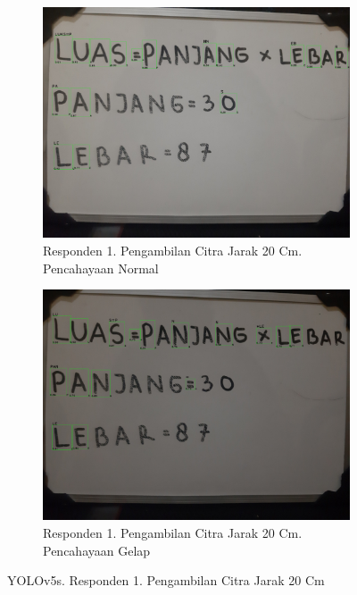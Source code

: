 \begin{figure}[H]
  \begin{subfigure}{.5\textwidth}
    \centering
    \captionsetup{width=.8\linewidth}
    \includegraphics[width=.8\linewidth]{gambar/yolov5s/responden1/dinda20cm00-result.jpg}
    \caption{Responden 1. Pengambilan Citra Jarak 20 Cm. Pencahayaan Normal}
    \label{fig:sr1tcitra20cm}
  \end{subfigure}%
  \begin{subfigure}{.5\textwidth}
    \centering
    \captionsetup{width=.8\linewidth}
    \includegraphics[width=.8\linewidth]{gambar/yolov5s/responden1/dinda20cm10-result.jpg}
    \caption{Responden 1. Pengambilan Citra Jarak 20 Cm. Pencahayaan Gelap}
    \label{fig:sr1gcitra20cm}
  \end{subfigure}
  \caption{YOLOv5s. Responden 1. Pengambilan Citra Jarak 20 Cm}
  \label{fig:sr1citra20cm}
\end{figure}

